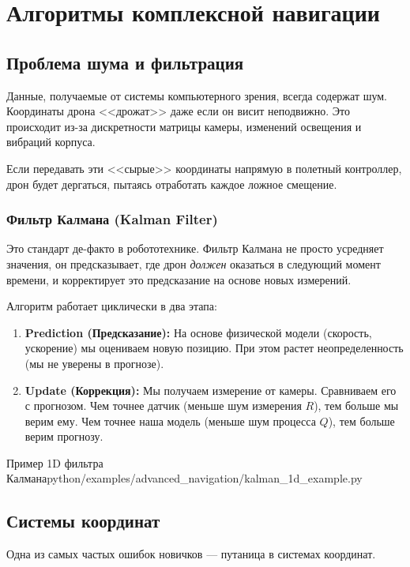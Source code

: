 \section{Алгоритмы комплексной навигации}

\subsection{Проблема шума и фильтрация}
Данные, получаемые от системы компьютерного зрения, всегда содержат шум. Координаты дрона <<дрожат>> даже если он висит неподвижно. Это происходит из-за дискретности матрицы камеры, изменений освещения и вибраций корпуса.

Если передавать эти <<сырые>> координаты напрямую в полетный контроллер, дрон будет дергаться, пытаясь отработать каждое ложное смещение.

\subsubsection{Фильтр Калмана (Kalman Filter)}
Это стандарт де-факто в робототехнике. Фильтр Калмана не просто усредняет значения, он предсказывает, где дрон \textit{должен} оказаться в следующий момент времени, и корректирует это предсказание на основе новых измерений.

Алгоритм работает циклически в два этапа:
\begin{enumerate}
    \item \textbf{Prediction (Предсказание):} На основе физической модели (скорость, ускорение) мы оцениваем новую позицию. При этом растет неопределенность (мы не уверены в прогнозе).
    \item \textbf{Update (Коррекция):} Мы получаем измерение от камеры. Сравниваем его с прогнозом. Чем точнее датчик (меньше шум измерения $R$), тем больше мы верим ему. Чем точнее наша модель (меньше шум процесса $Q$), тем больше верим прогнозу.
\end{enumerate}

\begin{codefiletitle}[python]{Пример 1D фильтра Калмана}{python/examples/advanced_navigation/kalman_1d_example.py}
\end{codefiletitle}

\subsection{Системы координат}
Одна из самых частых ошибок новичков — путаница в системах координат.

